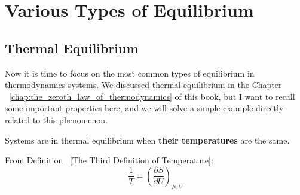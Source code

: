 \documentclass[~/PhyAI/phyai.tex]{subfiles}
\begin{document}
\section{Various Types of Equilibrium}\label{sec:various_types_of_equilibrium} %
\subsection{Thermal Equilibrium}
Now it is time to focus on the most common types of equilibrium in thermodynamics systems. We discussed thermal equilibrium in the Chapter ~\ref{chap:the_zeroth_law_of_thermodynamics} of this book, but I want to recall some important properties here, and we will solve a simple example directly related to this phenomenon.
\begin{definition}
	\label{Definition of Thermal Equilibrium}
	Systems are in thermal equilibrium when \textbf{their temperatures} are the same.
\end{definition}
From Definition ~\ref{The Third Definition of Temperature}:
$$ \frac{1 }{T}= \left(\frac{\partial S }{\partial U}\right)_{N,V}  $$
\end{document}
